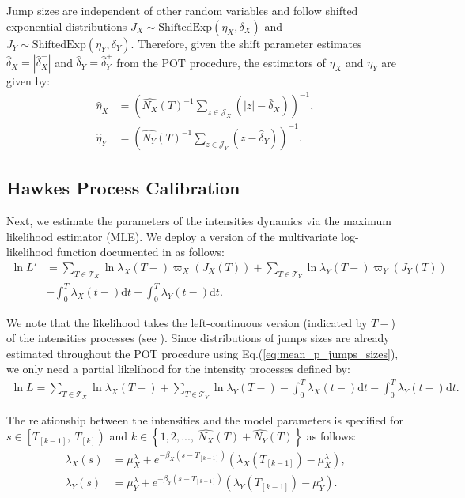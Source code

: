 \documentclass{article}
\newcommand{\diff}{\mathrm{d}}
\theoremstyle{definition}
\begin{document}
Jump sizes are independent of other random variables and follow shifted exponential distributions $J_X \sim \text{ShiftedExp}(\eta_X, \delta_X)$ and $J_Y \sim \text{ShiftedExp}(\eta_Y, \delta_Y)$. 
Therefore, given the shift parameter estimates $\widehat \delta_X = |\widehat \delta_X^-|$ and $\widehat \delta_Y = \widehat \delta_Y^+$ from the POT procedure, the estimators of $\eta_X$ and $\eta_Y$ are given by:
\begin{equation}\label{eq:mean_p_jumps_sizes}
   \begin{split}
\widehat \eta_X &= \left(\widehat{N_X}(T)^{-1} \sum_{z \in \mathcal{J}_X}\left(|z| - \widehat \delta_X\right)\right)^{-1},\\
\widehat \eta_Y &= \left(\widehat{N_Y}(T)^{-1} \sum_{z \in \mathcal{J}_Y}\left(z - \widehat \delta_Y\right)\right)^{-1}. 
   \end{split}
\end{equation}

\subsection{Hawkes Process Calibration}

Next, we estimate the parameters of the intensities dynamics via the maximum likelihood estimator (MLE). We deploy a version of the multivariate log-likelihood function documented in \cite{embrechts2011multivariate} as follows:
\begin{align}
 \ln L' &= \sum_{T \in \mathcal{T}_X} \ln \lambda_X(T-)\varpi_X(J_X(T))
         + \sum_{T \in \mathcal{T}_Y} \ln \lambda_Y(T-)\varpi_Y(J_Y(T)) \nonumber\\
 &- \int_0^T \lambda_X(t-)\diff t 
 - \int_0^T \lambda_Y(t-)\diff t.
\end{align}

We note that the likelihood takes the left-continuous version (indicated by $T-$) of the intensities processes (see \citep[p. 232]{daley2003introduction}). Since distributions of jumps sizes are already estimated throughout the POT procedure using Eq.(\ref{eq:mean_p_jumps_sizes}), we only need a partial likelihood for the intensity processes defined by: 
\begin{align}
 \ln L = \sum_{T \in \mathcal{T}_X} \ln \lambda_X(T-)
 + 
  \sum_{T \in \mathcal{T}_Y} \ln \lambda_Y(T-)
 - \int_0^T \lambda_X(t-)\diff t
 - \int_0^T \lambda_Y(t-)\diff t. \label{eq:likelihood}
\end{align}

The relationship between the intensities and the model parameters is specified for $s \in \left[T_{[k-1]},\ T_{[k]}\right)$ and $k \in \left\{1,2,...,\ \widehat{N_X}(T)+\widehat{N_Y}(T)\right\}$ as follows:
\begin{align}
 \lambda_X(s) &= \mu_X^\lambda + e^{-\beta_X\left(s - T_{[k-1]}\right)}\left(\lambda_X(T_{[k-1]})-\mu_X^\lambda\right),\\
 \lambda_Y(s) &= \mu_Y^\lambda + e^{-\beta_Y\left(s - T_{[k-1]}\right)}\left(\lambda_Y(T_{[k-1]})-\mu_Y^\lambda\right).
\end{align}
\end{document}
